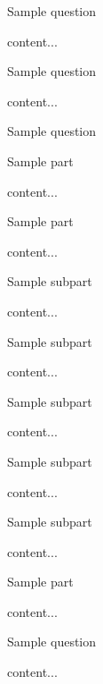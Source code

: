 \documentclass[11pt]{article} %
\begin{document}
\begin{qstn}[3]
	Sample question
\begin{soln}
	content...
\end{soln}
\end{qstn}

\begin{qstn}[4]
	Sample question
\begin{soln}
	content...
\end{soln}
\end{qstn}

\begin{qstn}[5]
	Sample question
\begin{assgnenum}
	\qitem Sample part
	\begin{soln}
		content...
	\end{soln}
	\qitem Sample part
	\begin{soln}
		content...
	\end{soln}
	\begin{assgnenum}
		\qitem Sample subpart
		\begin{soln}
			content...
		\end{soln}
		\qitem Sample subpart
		\begin{soln}
			content...
		\end{soln}
		\begin{assgnenum}
			\qitem Sample subpart
			\begin{soln}
				content...
			\end{soln}
			\qitem Sample subpart
			\begin{soln}
				content...
			\end{soln}
		\end{assgnenum}
		\qitem Sample subpart
		\begin{soln}
			content...
		\end{soln}
	\end{assgnenum}
	\qitem Sample part
	\begin{soln}
		content...
	\end{soln}
\end{assgnenum}
\end{qstn}

\begin{qstn}[6]
	Sample question
\begin{soln}
	content...
\end{soln}
\end{qstn}
\end{document}
